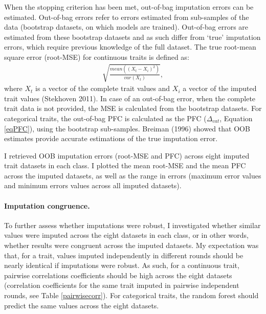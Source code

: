When the stopping criterion has been met, out-of-bag imputation errors can be estimated.
Out-of-bag errors refer to errors estimated from sub-samples of the data (bootstrap datasets, on which models are trained). Out-of-bag errors are estimated from these bootstrap datasets and as such differ from `true' imputation errors, which require previous knowledge of the full dataset. The true root-mean square error (root-MSE) for continuous traits is defined as: 
\begin{align}
\sqrt{\frac{mean\left(\left(X_t-X_i\right)^2\right)}{var\left(X_t\right)}}, 
\end{align}
where $X_t$ is a vector of the complete trait values and $X_i$ a vector of the imputed trait values (Stekhoven 2011). In case of an out-of-bag error, when the complete trait data is not provided, the MSE is calculated from the bootstrap datasets. For categorical traits, the out-of-bag PFC is calculated as the PFC ($\Delta_{cat}$, Equation \ref{eqPFC}), using the bootstrap sub-samples. Breiman (1996) showed that OOB estimates provide accurate estimations of the true imputation error. 

I retrieved OOB imputation errors (root-MSE and PFC) across eight imputed trait datasets in each class. I plotted the mean root-MSE and the mean PFC across the imputed datasets, as well as the range in errors (maximum error values and minimum errors values across all imputed datasets).

\paragraph{Imputation congruence.} To further assess whether imputations were robust, I investigated whether similar values were imputed across the eight datasets in each class, or in other words, whether results were congruent across the imputed datasets.  My expectation was that, for a trait, values imputed independently in different rounds should be nearly identical if imputations were robust. As such, for a continuous trait, pairwise correlations coefficients should be high across the eight datasets (correlation coefficients for the same trait imputed in pairwise independent rounds, see Table \ref{pairwisecorr}). For categorical traits, the random forest should predict the same values across the eight datasets. 

